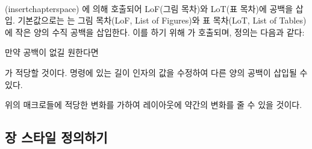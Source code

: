 
\begin{syntax}
\cmd{\insertchapterspace} \\
\end{syntax}
\glossary(insertchapterspace)%
  {}%
  {에 의해 호출되어 LoF(그림 목차)와 LoT(표 목차)에 공백을 삽입.}
기본값으로는 \cmd{\chapter}는 그림 목차(LoF, List of Figures)와
표 목차(LoT, List of Tables)에 작은 양의 수직 공백을 삽입한다.
이를 하기 위해 \cmd{\insertchapterspace}가 호출되며, 정의는 다음과 같다:
\begin{lcode}
\newcommand{\insertchapterspace}{%
  \addtocontents{lof}{\protect\addvspace{10pt}}%
  \addtocontents{lot}{\protect\addvspace{10pt}}%
}
\end{lcode}
만약 공백이 없길 원한다면
\begin{lcode}
\renewcommand{\insertchapterspace}{}
\end{lcode}
가 적당할 것이다.
\cmd{\addvspace} 명령에 있는 길이 인자의 값을 수정하여
다른 양의 공백이 삽입될 수 있다.

위의 매크로들에 적당한 변화를 가하여 레이아웃에 약간의 변화를 줄 수 있을 것이다.


\subsection{장 스타일 정의하기} \label{sec:chapterstyle}

